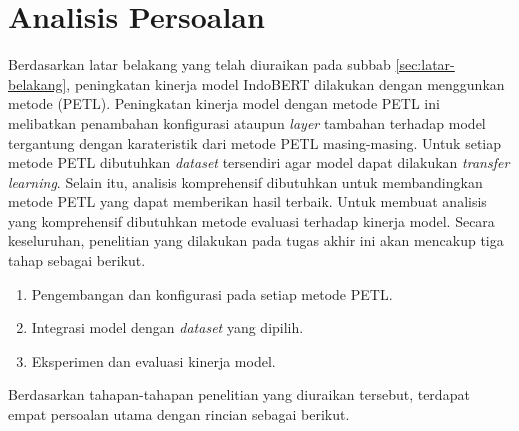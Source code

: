 \section{Analisis Persoalan}
\label{sec:analisis-persoalan}

Berdasarkan latar belakang yang telah diuraikan pada subbab \ref{sec:latar-belakang}, peningkatan kinerja model IndoBERT dilakukan dengan menggunkan metode \PETL (PETL). Peningkatan kinerja model dengan metode PETL ini melibatkan penambahan konfigurasi ataupun \textit{layer} tambahan terhadap model tergantung dengan karateristik dari metode PETL masing-masing. Untuk setiap metode PETL dibutuhkan \textit{dataset} tersendiri agar model dapat dilakukan \textit{transfer learning}. Selain itu, analisis komprehensif dibutuhkan untuk membandingkan metode PETL yang dapat memberikan hasil terbaik. Untuk membuat analisis yang komprehensif dibutuhkan metode evaluasi terhadap kinerja model. Secara keseluruhan, penelitian yang dilakukan pada tugas akhir ini akan mencakup tiga tahap sebagai berikut.

\begin{enumerate}
    \item Pengembangan dan konfigurasi pada setiap metode PETL.
    \item Integrasi model dengan \textit{dataset} yang dipilih.
    \item Eksperimen dan evaluasi kinerja model.
\end{enumerate}

Berdasarkan tahapan-tahapan penelitian yang diuraikan tersebut, terdapat empat persoalan utama dengan rincian sebagai berikut.

